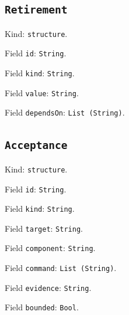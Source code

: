 \documentclass[11pt]{article}
\begin{document}
\subsection*{\texttt{Retirement}}
\noindent Kind: \texttt{structure}.\par
\noindent Field \texttt{id}: \texttt{String}.\par
\noindent Field \texttt{kind}: \texttt{String}.\par
\noindent Field \texttt{value}: \texttt{String}.\par
\noindent Field \texttt{dependsOn}: \texttt{List (String)}.\par
\subsection*{\texttt{Acceptance}}
\noindent Kind: \texttt{structure}.\par
\noindent Field \texttt{id}: \texttt{String}.\par
\noindent Field \texttt{kind}: \texttt{String}.\par
\noindent Field \texttt{target}: \texttt{String}.\par
\noindent Field \texttt{component}: \texttt{String}.\par
\noindent Field \texttt{command}: \texttt{List (String)}.\par
\noindent Field \texttt{evidence}: \texttt{String}.\par
\noindent Field \texttt{bounded}: \texttt{Bool}.\par
\end{document}
